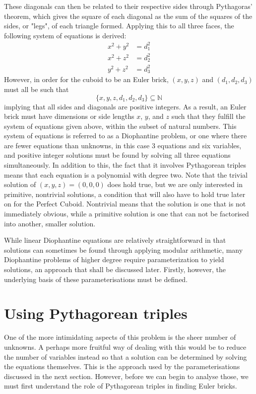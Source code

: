 \documentclass[11pt]{article}
\begin{document}
These diagonals can then be related to their respective sides through Pythagoras' theorem, which gives the square of each diagonal as the sum of the squares of the sides, or "legs", of each triangle formed. Applying this to all three faces, the following system of equations is derived:
\begin{equation}
\begin{aligned}
x^2+y^2&=d_1^2 \\
x^2+z^2&=d_2^2 \\
y^2+z^2&=d_3^2 
\end{aligned}
\label{eq:1}
\end{equation}
However, in order for the cuboid to be an Euler brick, $(x, y, z)$ and $(d_1, d_2, d_3)$ must all be such that 
$${\{x, y, z, d_1, d_2, d_3\}}\subseteq{\mathbb{N}}$$
implying that all sides and diagonals are positive integers.
As a result, an Euler brick must have dimensions or side lengths $x$, $y$, and $z$ such that they fulfill the system of equations given above, within the subset of natural numbers. This system of equations is referred to as a Diophantine problem, or one where there are fewer equations than unknowns, in this case 3 equations and six variables, and positive integer solutions must be found by solving all three equations simultaneously. In addition to this, the fact that it involves Pythagorean triples means that each equation is a polynomial with degree two. Note that the trivial solution of $(x, y, z)=(0, 0, 0)$ does hold true, but we are only interested in primitive, nontrivial solutions, a condition that will also have to hold true later on for the Perfect Cuboid. Nontrivial means that the solution is one that is not immediately obvious, while a primitive solution is one that can not be factorised into another, smaller solution.\cite{trivial} 

While linear Diophantine equations are relatively straightforward in that solutions can sometimes be found through applying modular arithmetic, many  Diophantine problems of higher degree require parameterization to yield solutions, an approach that shall be discussed later. Firstly, however, the underlying basis of these parameterisations must be defined.

\section{Using Pythagorean triples}
One of the more intimidating aspects of this problem is the sheer number of unknowns. A perhaps more fruitful way of dealing with this would be to reduce the number of variables instead so that a solution can be determined by solving the equations themselves. This is the approach used by the parameterisations discussed in the next section. However, before we can begin to analyse those, we must first understand the role of Pythagorean triples in finding Euler bricks.
\end{document}
